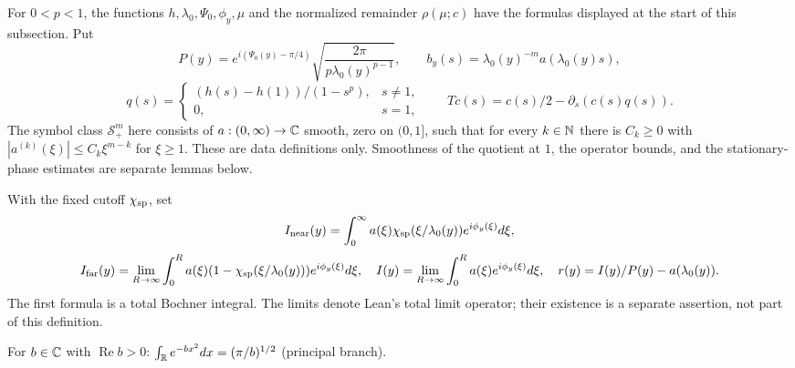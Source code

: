 \begin{definition}
  \label{def:c03_stationary_data}
  For $0<p<1$, the functions $h,\lambda_0,\Psi_0,\phi_y,\mu$ and the normalized remainder
  $\rho(\mu;c)$ have the formulas displayed at the start of this subsection. Put
  \[
    P(y)=e^{i(\Psi_0(y)-\pi/4)}\sqrt{\frac{2\pi}{p\lambda_0(y)^{p-1}}},\qquad
    b_y(s)=\lambda_0(y)^{-m}a(\lambda_0(y)s),
  \]
  \[
    q(s)=\begin{cases}(h(s)-h(1))/(1-s^p),&s\ne1,\\0,&s=1,\end{cases}
    \qquad Tc(s)=c(s)/2-\partial_s(c(s)q(s)).
  \]
  The symbol class $\mathcal S^m_+$ here consists of $a:(0,\infty)\to\mathbb{C}$ smooth,
  zero on $(0,1]$, such that for every $k\in\mathbb{N}$ there is $C_k\ge0$ with
  $|a^{(k)}(\xi)|\le C_k\xi^{m-k}$ for $\xi\ge1$.
  These are data definitions only. Smoothness of the quotient at $1$, the operator bounds,
  and the stationary-phase estimates are separate lemmas below.
\end{definition}

\begin{definition}
  \label{def:c03_stationary_integrals}
  With the fixed cutoff $\chi_{\rm sp}$, set
  \[
    I_{\rm near}(y)=\int_0^\infty a(\xi)\chi_{\rm sp}(\xi/\lambda_0(y))e^{i\phi_y(\xi)}d\xi,
  \]
  \[
    I_{\rm far}(y)=\lim_{R\to\infty}\int_0^R a(\xi)(1-\chi_{\rm sp}(\xi/\lambda_0(y)))e^{i\phi_y(\xi)}d\xi,
    \quad I(y)=\lim_{R\to\infty}\int_0^R a(\xi)e^{i\phi_y(\xi)}d\xi,
    \quad r(y)=I(y)/P(y)-a(\lambda_0(y)).
  \]
  The first formula is a total Bochner integral. The limits denote Lean's total limit operator;
  their existence is a separate assertion, not part of this definition.
\end{definition}

\begin{lemma}
  \label{lem:c03_gaussian_complex}
  \mathlibok
  For $b\in\mathbb{C}$ with $\operatorname{Re}b>0$: $\int_{\mathbb{R}} e^{-bx^2}dx=(\pi/b)^{1/2}$ (principal branch).
\end{lemma}

